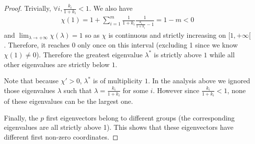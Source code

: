 \documentclass{report}
\begin{document}
{\begin{proof}
Trivially, $\forall i, \frac{k_i}{1 + k_i} < 1$. We also have
\begin{align}
  \chi(1) = 1 + \sum_{i=1}^{m} \frac1{1 + k_i} \frac1{ \frac{k_i}{1 + k_i} - 1} = 1 - m < 0
\end{align}
 and $\lim_{\lambda \rightarrow + \infty} \chi(\lambda) = 1$ so as $\chi$
 is continuous and strictly increasing on $[1, +\infty[$. Therefore, it reaches $0$ only once on this interval (excluding 1 since we know $\chi(1) \neq 0$). Therefore the greatest eigenvalue $\lambda^*$ is strictly above $1$ while all other eigenvalues are strictly below $1$.
 
  Note that because $\chi' > 0$, $\lambda^*$ is of multiplicity $1$. In the analysis above we ignored those eigenvalues $\lambda$ such that $\lambda = \frac{k_i}{1 + k_i}$ for some $i$. However since $\frac{k_i}{1 + k_i} < 1$, none of these eigenvalues can be the largest one.
 
 Finally, the $p$ first eigenvectors belong to different groups (the
 corresponding eigenvalues are all strictly above 1). This shows that these eigenvectors have
 different first non-zero coordinates. 
 
\end{proof}


}
\end{document}
